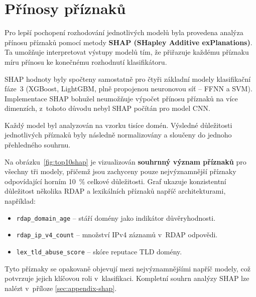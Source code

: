 \section{Přínosy příznaků}
\label{res:shap}

Pro lepší pochopení rozhodování jednotlivých modelů byla provedena analýza přínosu příznaků pomocí metody \textbf{SHAP (SHapley Additive exPlanations)}. Ta umožňuje interpretovat výstupy modelů tím, že přiřazuje každému příznaku míru přínosu ke konečnému rozhodnutí klasifikátoru.

SHAP hodnoty byly spočteny samostatně pro čtyři základní modely klasifikační fáze~3 (XGBoost, LightGBM, plně propojenou neuronovou síť – FFNN a SVM). Implementace SHAP bohužel neumožňuje výpočet přínosu příznaků na více dimenzích, z~tohoto důvodu nebyl SHAP počítán pro model CNN. 

Každý model byl analyzován na vzorku tisíce domén. Výsledné důležitosti jednotlivých příznaků byly následně normalizovány a sloučeny do jednoho přehledného souhrnu.

Na obrázku~\ref{fig:top10shap} je vizualizován \textbf{souhrnný význam příznaků} pro všechny tři modely, přičemž jsou zachyceny pouze nejvýznamnější příznaky odpovídající horním 10~\% celkové důležitosti. Graf ukazuje konzistentní důležitost několika RDAP a lexikálních příznaků napříč architekturami, například:

\begin{itemize}
    \item \texttt{rdap\_domain\_age} – stáří domény jako indikátor důvěryhodnosti.
    \item \texttt{rdap\_ip\_v4\_count} – množství IPv4 záznamů v~RDAP odpovědi.
    \item \texttt{lex\_tld\_abuse\_score} – skóre reputace TLD domény.
\end{itemize}

Tyto příznaky se opakovaně objevují mezi nejvýznamnějšími napříč modely, což potvrzuje jejich klíčovou roli v~klasifikaci. Kompletní souhrn analýzy SHAP lze nalézt v~příloze \ref{sec:appendix-shap}.

